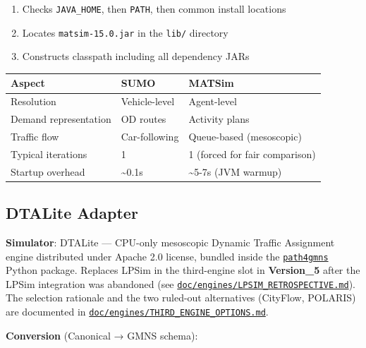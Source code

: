 \begin{enumerate}
\def\labelenumi{\arabic{enumi}.}
\tightlist
\item
  Checks \texttt{JAVA\_HOME}, then \texttt{PATH}, then common install
  locations
\item
  Locates \texttt{matsim-15.0.jar} in the \texttt{lib/} directory
\item
  Constructs classpath including all dependency JARs
\end{enumerate}

\begin{longtable}[]{@{}lll@{}}
\toprule\noalign{}
Aspect & SUMO & MATSim \\
\midrule\noalign{}
\endhead
\bottomrule\noalign{}
\endlastfoot
Resolution & Vehicle-level & Agent-level \\
Demand representation & OD routes & Activity plans \\
Traffic flow & Car-following & Queue-based (mesoscopic) \\
Typical iterations & 1 & 1 (forced for fair comparison) \\
Startup overhead & \textasciitilde0.1s & \textasciitilde5-7s (JVM
warmup) \\
\end{longtable}

\subsection{DTALite Adapter}\label{344-dtalite-adapter}

\textbf{Simulator}: DTALite --- CPU-only mesoscopic Dynamic Traffic
Assignment engine distributed under Apache 2.0 license, bundled inside
the \href{https://github.com/jdlph/Path4GMNS}{\texttt{path4gmns}} Python
package. Replaces LPSim in the third-engine slot in \textbf{Version\_5}
after the LPSim integration was abandoned (see
\href{../engines/LPSIM_RETROSPECTIVE.md}{\texttt{doc/engines/LPSIM\_RETROSPECTIVE.md}}).
The selection rationale and the two ruled-out alternatives (CityFlow,
POLARIS) are documented in
\href{../engines/THIRD_ENGINE_OPTIONS.md}{\texttt{doc/engines/THIRD\_ENGINE\_OPTIONS.md}}.

\textbf{Conversion} (Canonical → GMNS schema):

